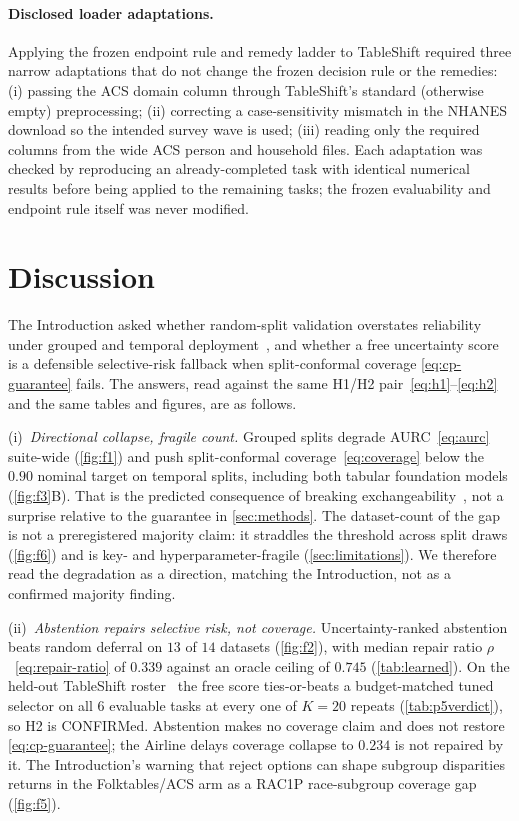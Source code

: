 \documentclass[pdflatex,sn-mathphys-num]{sn-jnl}
\begin{document}
\paragraph{Disclosed loader adaptations.} Applying the frozen endpoint rule and remedy
ladder to TableShift required three narrow adaptations that do not change the
frozen decision rule or the remedies: (i) passing the ACS domain column through TableShift's
standard (otherwise empty) preprocessing; (ii) correcting a case-sensitivity mismatch in the
NHANES download so the intended survey wave is used; (iii) reading only the required columns
from the wide ACS person and household files. Each adaptation was checked by reproducing an
already-completed task with identical numerical results before being applied to the remaining
tasks; the frozen evaluability and endpoint rule itself was never modified.

\section{Discussion}\label{sec:discussion}
The Introduction asked whether random-split validation overstates reliability under grouped and temporal
deployment~\citep{quinonerocandela2009datasetshift,gardner2023tableshift,whyshift2023}, and whether a free
uncertainty score is a defensible selective-risk fallback when split-conformal coverage
\eqref{eq:cp-guarantee} fails. The answers, read against the same H1/H2 pair~\eqref{eq:h1}--\eqref{eq:h2}
and the same tables and figures, are as follows.

(i)~\emph{Directional collapse, fragile count.} Grouped splits degrade AURC~\eqref{eq:aurc} suite-wide
(\cref{fig:f1}) and push split-conformal coverage~\eqref{eq:coverage} below the $0.90$ nominal target on
temporal splits, including both tabular foundation models (\cref{fig:f3}B). That is the predicted
consequence of breaking exchangeability~\citep{vovk2005algorithmic,lei2018distribution,tibshirani2019covariate,barber2023beyond},
not a surprise relative to the guarantee in \cref{sec:methods}. The dataset-count of the gap is not a
preregistered majority claim: it straddles the threshold across split draws (\cref{fig:f6}) and is
key- and hyperparameter-fragile (\cref{sec:limitations}). We therefore read the degradation as a
direction, matching the Introduction, not as a confirmed majority finding.

(ii)~\emph{Abstention repairs selective risk, not coverage.} Uncertainty-ranked abstention beats random
deferral on $13$ of $14$ datasets (\cref{fig:f2}), with median repair ratio $\rho$~\eqref{eq:repair-ratio}
of $0.339$ against an oracle ceiling of $0.745$ (\cref{tab:learned}). On the held-out TableShift
roster~\citep{gardner2023tableshift} the free score ties-or-beats a budget-matched tuned selector on all
$6$ evaluable tasks at every one of $K{=}20$ repeats (\cref{tab:p5verdict}), so H2 is CONFIRMed.
Abstention makes no coverage claim and does not restore \eqref{eq:cp-guarantee}; the
Airline delays coverage collapse to $0.234$ is not repaired by it. The Introduction's warning
that reject options can shape subgroup disparities~\citep{jones2021selective,kamiran2018reject} returns
in the Folktables/ACS arm as a RAC1P race-subgroup coverage gap (\cref{fig:f5}).
\end{document}
